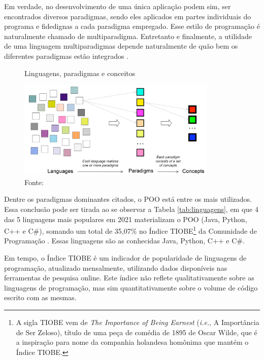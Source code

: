 Em verdade, no desenvolvimento de uma única aplicação podem sim, ser
encontrados diversos paradigmas, sendo eles aplicados em partes individuais do
programa e fidedignas a cada paradigma empregado. Esse estilo de programação é
naturalmente chamado de multiparadigma. Entretanto e finalmente, a utilidade de
uma linguagem multiparadigmas depende naturalmente de quão bem os diferentes
paradigmas estão integrados \cite{bjarne_1995,van_roy_2004}.

\begin{figure}[!htb]
  \centering
  \caption{Linguagens, paradigmas e conceitos}
  \includegraphics[width=0.85\textwidth]{../figures/concepts.png}
  \caption*{Fonte: }
  \label{fig:concepts}
\end{figure}

Dentre os paradigmas dominantes citados, o POO está entre os mais utilizados.
Essa conclusão pode ser tirada ao se observar a Tabela \ref{tab:linguagens}, em
que 4 das 5 linguagens mais populares em 2021 materializam o POO (Java, Python,
C++ e C\#), somando um total de 35,07\% no Índice TIOBE\footnote{A sigla TIOBE
  vem de \textit{The Importance of Being Earnest} (\textit{i.e.}, A Importância de
  Ser Zeloso), título de uma peça de comédia de 1895 de Oscar Wilde, que é a
  inspiração para nome da companhia holandesa homônima que mantém o Índice TIOBE.}
da Comunidade de Programação \cite{tiobe_2021}. Essas linguagens são as
conhecidas Java, Python, C++ e C\#.

Em tempo, o Índice TIOBE é um indicador de popularidade de linguagens de
programação, atualizado mensalmente, utilizando dados disponíveis nas
ferramentas de pesquisa online. Este índice não reflete qualitativamente sobre
as linguagens de programação, mas sim quantitativamente sobre o volume de código
escrito com as mesmas.

